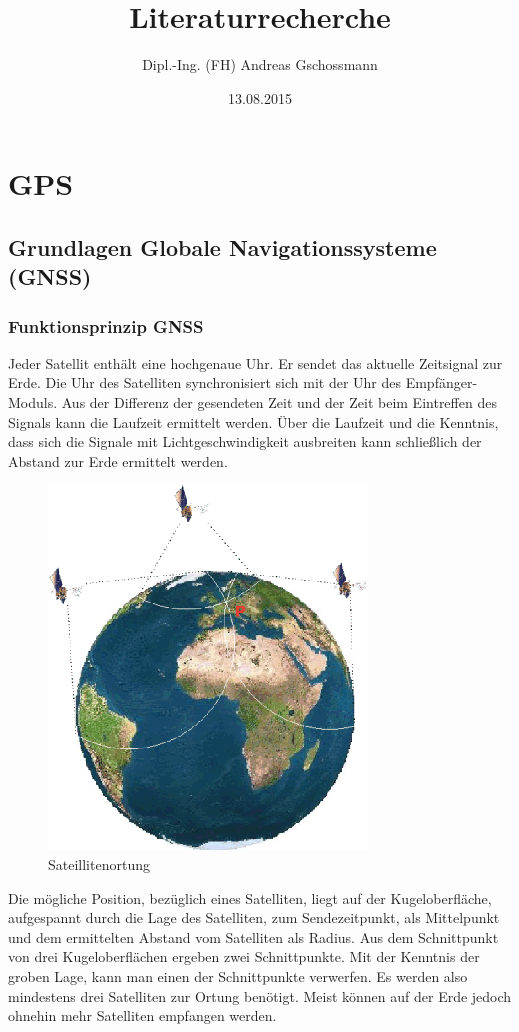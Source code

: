 \documentclass[letterpaper,11pt,ngerman]{andi}
\title{Literaturrecherche}
\date{13.08.2015}
\author{Dipl.-Ing. (FH) Andreas Gschossmann}
\begin{document}
\maketitle
\tableofcontents
{}\label{index::doc}

\setcounter{tocdepth}{2}

\chapter{GPS}
\label{index:welcome-to-mergedocs-s-documentation}\label{index:gps}

\section{Grundlagen Globale Navigationssysteme (GNSS)}
\label{included_projects/gps/GPS_SPEC/content::doc}\label{included_projects/gps/GPS_SPEC/content:grundlagen-globale-navigationssysteme-gnss}

\subsection{Funktionsprinzip GNSS}
\label{included_projects/gps/GPS_SPEC/content:funktionsprinzip-gnss}
Jeder Satellit enthält eine hochgenaue Uhr. Er sendet das aktuelle Zeitsignal zur Erde. Die Uhr des Satelliten synchronisiert sich mit der Uhr des Empfänger- Moduls. Aus der Differenz der gesendeten Zeit und der Zeit beim Eintreffen des Signals kann die Laufzeit ermittelt werden. Über die Laufzeit und die Kenntnis, dass sich die Signale mit Lichtgeschwindigkeit ausbreiten kann schließlich der Abstand zur Erde ermittelt werden. \cite{sat_nav_schildt}
\begin{figure}[htbp]
\centering
\capstart

\includegraphics[width=0.350\linewidth]{gps_ranging.png}
\caption{Sateillitenortung \cite{fig_gps}}\end{figure}

Die mögliche Position, bezüglich eines Satelliten, liegt auf der Kugeloberfläche, aufgespannt durch die Lage des Satelliten, zum Sendezeitpunkt, als Mittelpunkt und dem ermittelten Abstand vom Satelliten als Radius. Aus dem Schnittpunkt von drei Kugeloberflächen ergeben zwei Schnittpunkte. Mit der Kenntnis der groben Lage, kann man einen der Schnittpunkte verwerfen. Es werden also mindestens drei Satelliten zur Ortung benötigt. Meist können auf der Erde jedoch ohnehin mehr Satelliten empfangen werden. \cite{sat_nav_schildt}
\end{document}
